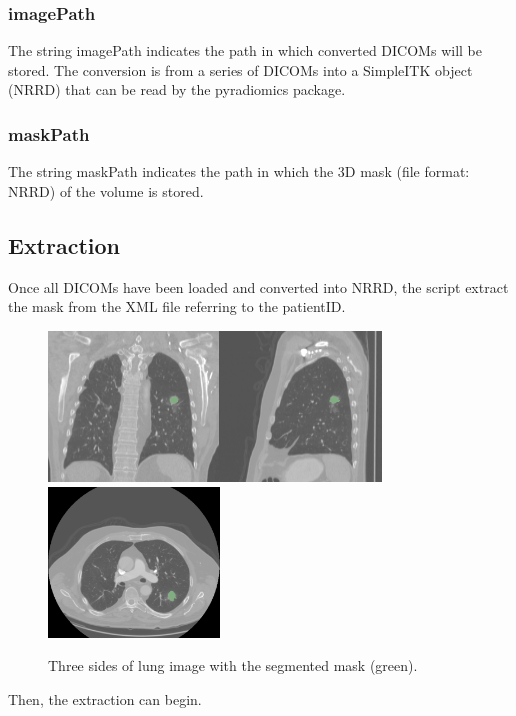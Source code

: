 \documentclass[12pt]{article}
\begin{document}
	\subsubsection{imagePath}
The string imagePath indicates the path in which converted DICOMs will be stored.
The conversion is from a series of DICOMs into a SimpleITK object (NRRD) that can be read by the pyradiomics \cite{pyradiomics} package.

	\subsubsection{maskPath}
The string maskPath indicates the path in which the 3D mask (file format: NRRD) of the volume is stored.

	\subsection{Extraction}
Once all DICOMs have been loaded and converted into NRRD, the script extract the mask from the XML file referring to the patientID.

\begin{figure}[htp]

\centering
\includegraphics[width=.3\textwidth, height = 4cm]{LUNG1}\includegraphics[width=.3\textwidth,  height = 4cm]{LUNG2}\includegraphics[width=.3\textwidth,  height = 4cm]{LUNG3}

\caption{Three sides of lung image with the segmented mask (green).}

\end{figure}
Then, the extraction can begin.
\end{document}
